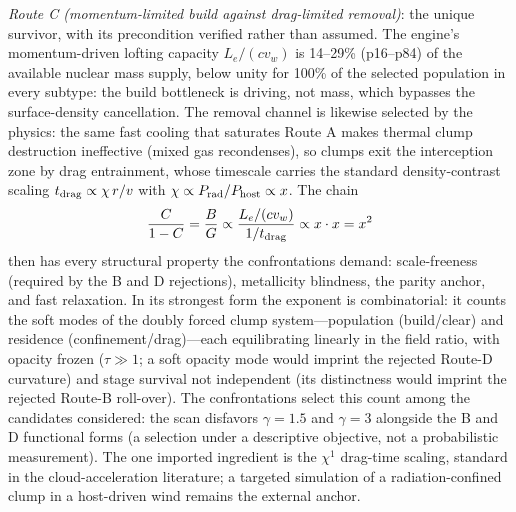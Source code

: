 \documentclass[twocolumn]{aastex631}
\begin{document}
\emph{Route C (momentum-limited build against drag-limited removal)}: the
unique survivor, with its precondition verified rather than assumed. The
engine's momentum-driven lofting capacity $L_{e}/(cv_{w})$ is 14--29\%
(p16--p84) of the available nuclear mass supply, below unity for 100\% of
the selected population in every subtype: the build bottleneck is driving,
not mass, which bypasses the surface-density cancellation. The removal
channel is likewise selected by the physics: the same fast cooling that
saturates Route A makes thermal clump destruction ineffective (mixed gas
recondenses), so clumps exit the interception zone by drag entrainment,
whose timescale carries the standard density-contrast scaling
$t_{\rm drag}\propto\chi\,r/v$ with
$\chi\propto P_{\rm rad}/P_{\rm host}\propto x$. The chain
\begin{equation}
\frac{C}{1-C}=\frac{B}{G}
\propto\frac{L_{e}/(cv_{w})}{1/t_{\rm drag}}
\propto x\cdot x=x^{2}
\end{equation}
then has every structural property the confrontations demand:
scale-freeness (required by the B and D rejections), metallicity
blindness, the parity anchor, and fast relaxation. In its strongest form
the exponent is combinatorial: it counts the soft modes of the doubly
forced clump system---population (build/clear) and residence
(confinement/drag)---each equilibrating linearly in the field ratio, with
opacity frozen ($\tau\gg1$; a soft opacity mode would imprint the
rejected Route-D curvature) and stage survival not independent (its
distinctness would imprint the rejected Route-B roll-over). The
confrontations select this count among the candidates considered: the
scan disfavors $\gamma=1.5$ and $\gamma=3$ alongside the B and D
functional forms (a selection under a descriptive objective, not a
probabilistic measurement). The one imported ingredient is the
$\chi^{1}$ drag-time scaling, standard in the cloud-acceleration
literature; a targeted simulation of a radiation-confined clump in a
host-driven wind remains the external anchor.
\end{document}
